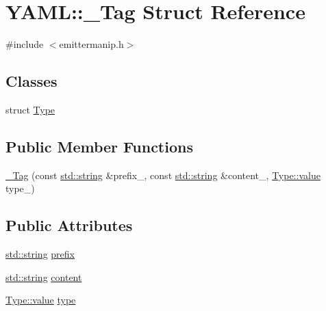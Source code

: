 \hypertarget{struct_y_a_m_l_1_1___tag}{}\section{Y\+A\+ML\+::\+\_\+\+Tag Struct Reference}
\label{struct_y_a_m_l_1_1___tag}


{\ttfamily \#include $<$emittermanip.\+h$>$}

\subsection*{Classes}
\begin{DoxyCompactItemize}
\item 
struct \mbox{\hyperlink{struct_y_a_m_l_1_1___tag_1_1_type}{Type}}
\end{DoxyCompactItemize}
\subsection*{Public Member Functions}
\begin{DoxyCompactItemize}
\item 
\mbox{\hyperlink{struct_y_a_m_l_1_1___tag_adb4050c5d32f6103bafd42b9c02df420}{\+\_\+\+Tag}} (const \mbox{\hyperlink{glad_8h_ac83513893df92266f79a515488701770}{std\+::string}} \&prefix\+\_\+, const \mbox{\hyperlink{glad_8h_ac83513893df92266f79a515488701770}{std\+::string}} \&content\+\_\+, \mbox{\hyperlink{struct_y_a_m_l_1_1___tag_1_1_type_a4bce10ea85e05e6d2424d3575e2bf53d}{Type\+::value}} type\+\_\+)
\end{DoxyCompactItemize}
\subsection*{Public Attributes}
\begin{DoxyCompactItemize}
\item 
\mbox{\hyperlink{glad_8h_ac83513893df92266f79a515488701770}{std\+::string}} \mbox{\hyperlink{struct_y_a_m_l_1_1___tag_ac7614df0527b721a75b39945e4cc5ce6}{prefix}}
\item 
\mbox{\hyperlink{glad_8h_ac83513893df92266f79a515488701770}{std\+::string}} \mbox{\hyperlink{struct_y_a_m_l_1_1___tag_a0ef0126c5858fd0e31e4f1c31f7f280b}{content}}
\item 
\mbox{\hyperlink{struct_y_a_m_l_1_1___tag_1_1_type_a4bce10ea85e05e6d2424d3575e2bf53d}{Type\+::value}} \mbox{\hyperlink{struct_y_a_m_l_1_1___tag_ae46c0817b9c559ba6ade0658bd6c7a7d}{type}}
\end{DoxyCompactItemize}



